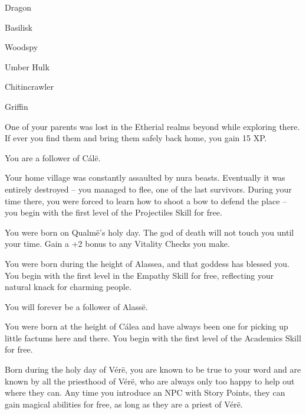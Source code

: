 \begin{multicols}{2}
\begin{list}{\addtocounter{list}{1}\textbf{:}}{\raggedleft}
\begin{list}{\addtocounter{enc}{-1}}{}
		\item Dragon

		\item Basilisk

		\item Woodspy

		\item Umber Hulk

		\item Chitincrawler

		\item Griffin

	\end{list}

	\item
	One of your parents was lost in the Etherial realms beyond while exploring there.
	If ever you find them and bring them safely back home, you gain 15 XP.

	You are a follower of C\'al\"e.

	\item
	Your home village was constantly assaulted by nura beasts.
	Eventually it was entirely destroyed -- you managed to flee, one of the last survivors.
	During your time there, you were forced to learn how to shoot a bow to defend the place -- you begin with the first level of the Projectiles Skill for free.

	\item
	You were born on Qualm\"{e}'s holy day.
	The god of death will not touch you until your time.
	Gain a +2 bonus to any Vitality Checks you make.

	\item
	You were born during the height of Alassea, and that goddess has blessed you.
	You begin with the first level in the Empathy Skill for free, reflecting your natural knack for charming people.

	You will forever be a follower of Alass\"e.

	\item
	You were born at the height of C\'{a}lea and have always been one for picking up little factums here and there.
	You begin with the first level of the Academics Skill for free.

	\item
	Born during the holy day of V\'{e}r\"{e}, you are known to be true to your word and are known by all the priesthood of V\'{e}r\"{e}, who are always only too happy to help out where they can.
	Any time you introduce an NPC with Story Points, they can gain magical abilities for free, as long as they are a priest of V\'er\"e.


\end{list}
\end{multicols}
